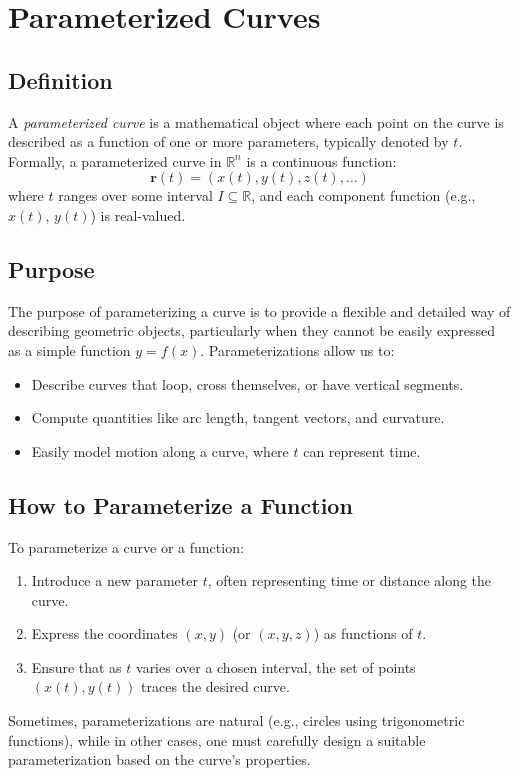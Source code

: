 \newpage
\section{Parameterized Curves}

\subsection{Definition}
A \emph{parameterized curve} is a mathematical object where each point on the curve is described as a function of one or more parameters, typically denoted by \( t \). Formally, a parameterized curve in \( \mathbb{R}^n \) is a continuous function:
\[
\mathbf{r}(t) = (x(t), y(t), z(t), \ldots)
\]
where \( t \) ranges over some interval \( I \subseteq \mathbb{R} \), and each component function (e.g., \( x(t) \), \( y(t) \)) is real-valued.

\subsection{Purpose}
The purpose of parameterizing a curve is to provide a flexible and detailed way of describing geometric objects, particularly when they cannot be easily expressed as a simple function \( y = f(x) \). Parameterizations allow us to:
\begin{itemize}[label=\(-\)]
    \item Describe curves that loop, cross themselves, or have vertical segments.
    \item Compute quantities like arc length, tangent vectors, and curvature.
    \item Easily model motion along a curve, where \( t \) can represent time.
\end{itemize}

\subsection{How to Parameterize a Function}
To parameterize a curve or a function:
\begin{enumerate}
    \item Introduce a new parameter \( t \), often representing time or distance along the curve.
    \item Express the coordinates \( (x, y) \) (or \( (x, y, z) \)) as functions of \( t \).
    \item Ensure that as \( t \) varies over a chosen interval, the set of points \( (x(t), y(t)) \) traces the desired curve.
\end{enumerate}
Sometimes, parameterizations are natural (e.g., circles using trigonometric functions), while in other cases, one must carefully design a suitable parameterization based on the curve's properties.
\vspace{\baselineskip}

